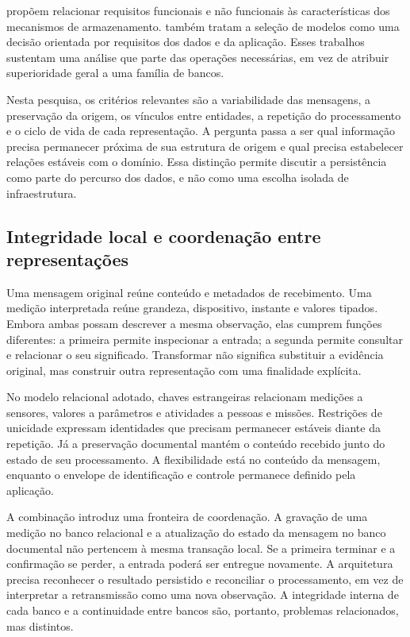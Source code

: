 \documentclass[tcc,capa]{texufpel}
\begin{document}
\citet{gessert2017} propõem relacionar requisitos funcionais e não funcionais às características dos mecanismos de armazenamento. \citet{royhubara2022} também tratam a seleção de modelos como uma decisão orientada por requisitos dos dados e da aplicação. Esses trabalhos sustentam uma análise que parte das operações necessárias, em vez de atribuir superioridade geral a uma família de bancos.

Nesta pesquisa, os critérios relevantes são a variabilidade das mensagens, a preservação da origem, os vínculos entre entidades, a repetição do processamento e o ciclo de vida de cada representação. A pergunta passa a ser qual informação precisa permanecer próxima de sua estrutura de origem e qual precisa estabelecer relações estáveis com o domínio. Essa distinção permite discutir a persistência como parte do percurso dos dados, e não como uma escolha isolada de infraestrutura.

\subsection{Integridade local e coordenação entre representações}
Uma mensagem original reúne conteúdo e metadados de recebimento. Uma medição interpretada reúne grandeza, dispositivo, instante e valores tipados. Embora ambas possam descrever a mesma observação, elas cumprem funções diferentes: a primeira permite inspecionar a entrada; a segunda permite consultar e relacionar o seu significado. Transformar não significa substituir a evidência original, mas construir outra representação com uma finalidade explícita.

No modelo relacional adotado, chaves estrangeiras relacionam medições a sensores, valores a parâmetros e atividades a pessoas e missões. Restrições de unicidade expressam identidades que precisam permanecer estáveis diante da repetição. Já a preservação documental mantém o conteúdo recebido junto do estado de seu processamento. A flexibilidade está no conteúdo da mensagem, enquanto o envelope de identificação e controle permanece definido pela aplicação.

A combinação introduz uma fronteira de coordenação. A gravação de uma medição no banco relacional e a atualização do estado da mensagem no banco documental não pertencem à mesma transação local. Se a primeira terminar e a confirmação se perder, a entrada poderá ser entregue novamente. A arquitetura precisa reconhecer o resultado persistido e reconciliar o processamento, em vez de interpretar a retransmissão como uma nova observação. A integridade interna de cada banco e a continuidade entre bancos são, portanto, problemas relacionados, mas distintos.
\end{document}
